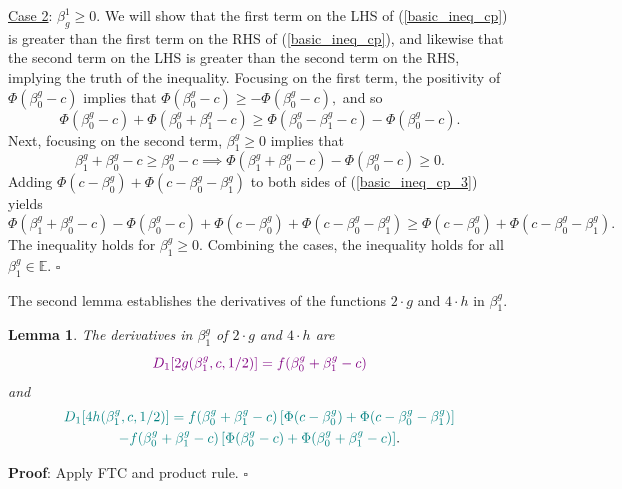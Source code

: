 \documentclass[12pt]{article}
\newtheorem{lemma}{Lemma}
\begin{document}
\begin{appendices}
\begin{refsection}
		\noindent
		\underline{Case 2}: $\beta^1_g \geq 0.$  We will show that the first term on the LHS of (\ref{basic_ineq_cp}) is greater than the first term on the RHS of (\ref{basic_ineq_cp}), and likewise that the second term on the LHS is greater than the second term on the RHS, implying the truth of the inequality. Focusing on the first term, the positivity of $\Phi(\beta^g_0 -c)$ implies that
		$\Phi(\beta^g_0 - c) \geq - \Phi(\beta^g_0 - c),$ and so
		$$\Phi(\beta^g_0 - c) + \Phi(\beta^g_0 + \beta^g_1 - c) \geq \Phi(\beta^g_0 - \beta^g_1 - c) - \Phi(\beta^g_0 - c).$$
		Next, focusing on the second term, $\beta^g_1 \geq 0$ implies that 
		\begin{equation}\label{basic_ineq_cp_3}
		\beta^g_1 + \beta^g_0 - c \geq \beta^g_0 - c \implies \Phi(\beta^g_1 + \beta^g_0 - c) - \Phi(\beta^g_0 - c) \geq 0.
		\end{equation}
		Adding $\Phi(c - \beta^g_0) + \Phi(c - \beta^g_0 - \beta^g_1)$ to both sides of (\ref{basic_ineq_cp_3}) yields
		\begin{equation*}
		\Phi(\beta^g_1 + \beta^g_0 - c) - \Phi(\beta^g_0 - c) + \Phi(c - \beta^g_0) + \Phi(c - \beta^g_0 - \beta^g_1) \geq \Phi(c - \beta^g_0) + \Phi(c - \beta^g_0 - \beta^g_1). \textrm{ }
		\end{equation*}
		The inequality holds for $\beta^g_1 \geq 0$. Combining the cases, the inequality holds for all $\beta^g_1 \in \mathbb{E}$. $\square$
		
		The second lemma establishes the derivatives of the functions $2\cdot g$ and $4 \cdot h$ in $\beta^g_1$.
		\begin{lemma}
			The derivatives in $\beta^g_1$ of $2\cdot g$ and $4\cdot h$ are
			\begin{equation}\label{dg_dbeta}
			\textcolor{violet}{D_1[2g(\beta^g_1, c, 1/2)] = f(\beta^g_0 + \beta^g_1 - c)}
			\end{equation}
			and
			\begin{multline}\label{dh_dbeta}
			\textcolor{teal}{D_1[4h(\beta^g_1, c, 1/2)] = f(\beta^g_0 + \beta^g_1 - c) \left[\Phi(c - \beta^g_0) + \Phi(c - \beta_0^g - \beta_1^g) \right]} \\ \textcolor{teal}{- f(\beta^g_0 + \beta^g_1 - c) \left[\Phi(\beta_0^g - c) + \Phi(\beta^g_0 + \beta^g_1 - c) \right]}.\end{multline}
		\end{lemma}
		\textbf{Proof}: Apply FTC and product rule. $\square$
		

\end{refsection}
\end{appendices}
\end{document}
